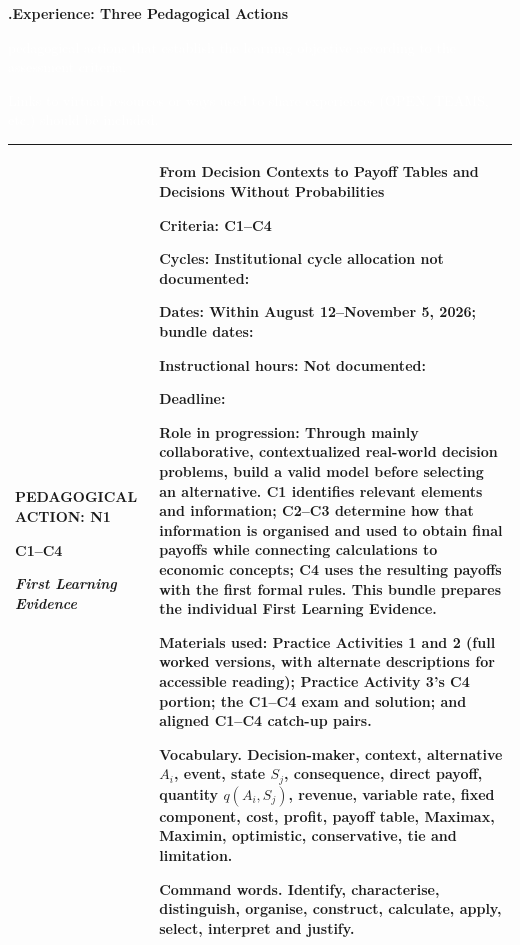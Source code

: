 \documentclass[10pt,letterpaper]{article}
\newcommand{\sectionbar}[1]{%
	\begin{tcolorbox}[
		enhanced,
		colback=sectionblue,
		colframe=sectionblue,
		boxrule=0pt,
		sharp corners,
		left=0.32in,
		right=0.08in,
		top=3.5pt,
		bottom=3.5pt,
		before skip=0pt,
		after skip=0pt,
		borderline north={1.15pt}{0pt}{black},
		borderline south={1.15pt}{0pt}{black}
		]
		\color{white}\bfseries\fontsize{12}{14}\selectfont #1
	\end{tcolorbox}%
}
\newcommand{\yellowmark}[1]{\colorbox{highlightyellow}{\strut\textcolor{white}{#1}}}
\newcommand{\labelled}[2]{\textbf{#1:} #2\par}
\begin{document}
	\newpage
	
	\sectionbar{5.\quad Experience: Three Pedagogical Actions
		\yellowmark{\fontsize{10.7}{12}\selectfont pedagogical actions that establish the learning objective according to the assessment criteria.}\par
		\hspace*{0.49in}\yellowmark{\fontsize{10.7}{12}\selectfont Links to virtual resources or ways used to share experiences (OPEN, TEAMS, etc.) should be included.}}
	
	\vspace{0.20in}
	
	\noindent
	\begin{tabularx}{\textwidth}{|>{\RaggedRight\arraybackslash}p{2.42in}|>{\RaggedRight\arraybackslash}X|}
		\hline
		\textbf{PEDAGOGICAL ACTION: N1}\par
		\textbf{C1--C4}\par
		\textit{First Learning Evidence}
		&
		\textbf{From Decision Contexts to Payoff Tables and Decisions Without Probabilities}\par
		\vspace{2pt}
		\fontsize{8.15}{10.25}\selectfont
		\labelled{Criteria}{C1--C4}
		\labelled{Cycles}{Institutional cycle allocation not documented: \underline{\hspace{2.2in}}}
		\labelled{Dates}{Within August 12--November 5, 2026; bundle dates: \underline{\hspace{2.1in}}}
		\labelled{Instructional hours}{Not documented: \underline{\hspace{1.6in}}}
		\labelled{Deadline}{\underline{\hspace{3in}}}
		\labelled{Role in progression}{Through mainly collaborative, contextualized real-world decision problems, build a valid model before selecting an alternative. C1 identifies relevant elements and information; C2--C3 determine how that information is organised and used to obtain final payoffs while connecting calculations to economic concepts; C4 uses the resulting payoffs with the first formal rules. This bundle prepares the individual First Learning Evidence.}
		\labelled{Materials used}{Practice Activities 1 and 2 (full worked versions, with alternate descriptions for accessible reading); Practice Activity 3's C4 portion; the C1--C4 exam and solution; and aligned C1--C4 catch-up pairs.}
		
		\textbf{Vocabulary.} Decision-maker, context, alternative $A_i$, event, state
		$S_j$, consequence, direct payoff, quantity $q(A_i,S_j)$, revenue, variable
		rate, fixed component, cost, profit, payoff table, Maximax, Maximin, optimistic,
		conservative, tie and limitation.
		
		\textbf{Command words.} Identify, characterise, distinguish, organise,
		construct, calculate, apply, select, interpret and justify.
		\\
		\hline
	\end{tabularx}
	
\end{document}
